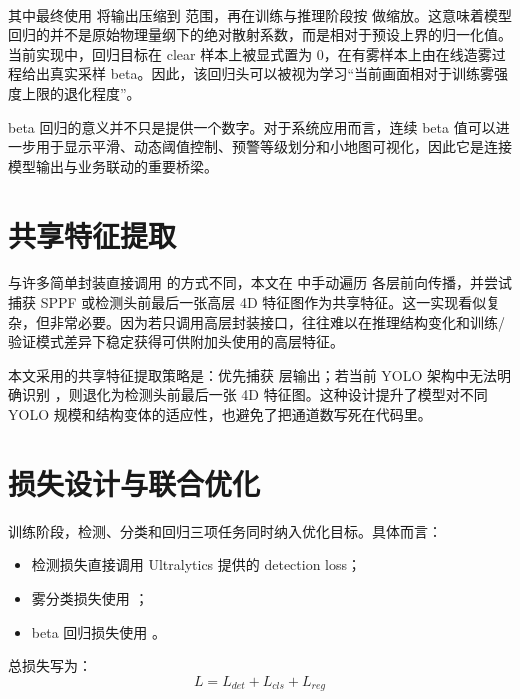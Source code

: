 \begin{center}
\small
{}\\
\end{center}

其中最终使用  将输出压缩到 \code{[0,1]} 范围，再在训练与推理阶段按  做缩放。这意味着模型回归的并不是原始物理量纲下的绝对散射系数，而是相对于预设上界的归一化值。当前实现中，回归目标在 clear 样本上被显式置为 0，在有雾样本上由在线造雾过程给出真实采样 beta。因此，该回归头可以被视为学习“当前画面相对于训练雾强度上限的退化程度”。

beta 回归的意义并不只是提供一个数字。对于系统应用而言，连续 beta 值可以进一步用于显示平滑、动态阈值控制、预警等级划分和小地图可视化，因此它是连接模型输出与业务联动的重要桥梁。

\section{共享特征提取}

与许多简单封装直接调用  的方式不同，本文在  中手动遍历  各层前向传播，并尝试捕获 SPPF 或检测头前最后一张高层 4D 特征图作为共享特征。这一实现看似复杂，但非常必要。因为若只调用高层封装接口，往往难以在推理结构变化和训练/验证模式差异下稳定获得可供附加头使用的高层特征。

本文采用的共享特征提取策略是：优先捕获  层输出；若当前 YOLO 架构中无法明确识别 ，则退化为检测头前最后一张 4D 特征图。这种设计提升了模型对不同 YOLO 规模和结构变体的适应性，也避免了把通道数写死在代码里。

\section{损失设计与联合优化}

训练阶段，检测、分类和回归三项任务同时纳入优化目标。具体而言：

\begin{itemize}[leftmargin=2em]
\item 检测损失直接调用 Ultralytics 提供的 detection loss\cite{ultralyticsDocs}；
\item 雾分类损失使用 ；
\item beta 回归损失使用 。
\end{itemize}

总损失写为：
\begin{equation}
L = L_{det} + L_{cls} + L_{reg}
\end{equation}

